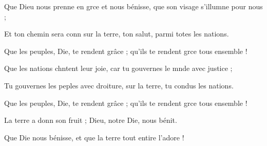 \item Que Dieu nous prenne en grce et nous bénisse,\psstar{} que son visage s’illumne pour nous ;
\item Et ton chemin sera conn sur la terre,\psstar{} ton salut, parmi totes les nations.
\item Que les peuples, Die, te rendent grâce ;\psstar{} qu’ils te rendent grce tous ensemble !
\item Que les nations chntent leur joie,\psstar{} car tu gouvernes le mnde avec justice ;
\item Tu gouvernes les peples avec droiture,\psstar{} sur la terre, tu condus les nations.
\item Que les peuples, Die, te rendent grâce ;\psstar{} qu’ils te rendent grce tous ensemble !
\item La terre a donn son fruit ;\psstar{} Dieu, notre Die, nous bénit.
\item Que Die nous bénisse,\psstar{} et que la terre tout entire l’adore !